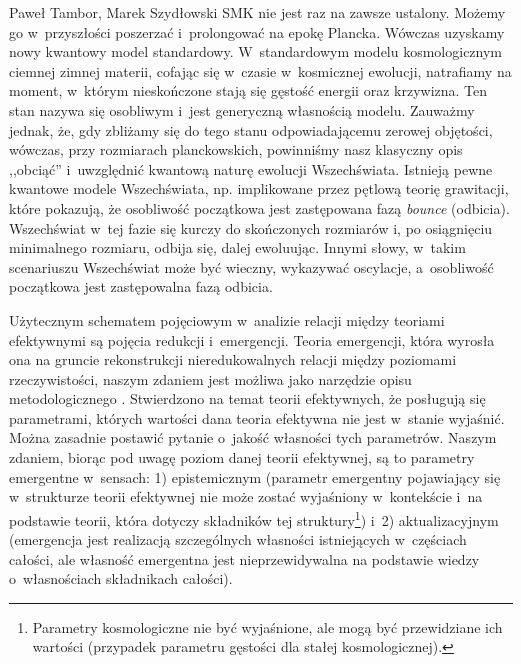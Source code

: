 \begin{artplenv2auth}{Paweł Tambor, Marek Szydłowski}
 SMK nie jest raz na zawsze ustalony. Możemy go w~przyszłości poszerzać i~prolongować na epokę Plancka. Wówczas uzyskamy nowy kwantowy model standardowy. W~standardowym modelu kosmologicznym ciemnej zimnej materii, cofając się w~czasie w~kosmicznej ewolucji, natrafiamy na moment, w~którym nieskończone stają się gęstość energii oraz krzywizna. Ten stan nazywa się osobliwym i~jest generyczną własnością modelu. Zauważmy jednak, że, gdy zbliżamy się do tego stanu odpowiadającemu zerowej objętości, wówczas, przy rozmiarach planckowskich, powinniśmy nasz klasyczny opis ,,obciąć'' i~uwzględnić kwantową naturę ewolucji Wszechświata. Istnieją pewne kwantowe modele Wszechświata, np. implikowane przez pętlową teorię grawitacji, które pokazują, że osobliwość początkowa jest zastępowana fazą \textit{bounce} (odbicia). Wszechświat w~tej fazie się kurczy do skończonych rozmiarów i, po osiągnięciu minimalnego rozmiaru, odbija się, dalej ewoluując. Innymi słowy, w~takim scenariuszu Wszechświat może być wieczny, wykazywać oscylacje, a~osobliwość początkowa jest zastępowalna fazą odbicia.

Użytecznym schematem pojęciowym w~analizie relacji między teoriami efektywnymi są pojęcia redukcji i~emergencji. Teoria emergencji, która wyrosła ona na gruncie rekonstrukcji nieredukowalnych relacji między poziomami rzeczywistości, naszym zdaniem jest możliwa jako narzędzie opisu metodologicznego
\parencite[][]{kim_making_1999}. %
 Stwierdzono na temat teorii efektywnych, że posługują się parametrami, których wartości dana teoria efektywna nie jest w~stanie wyjaśnić. Można zasadnie postawić pytanie o~jakość własności tych parametrów. Naszym zdaniem, biorąc pod uwagę poziom danej teorii efektywnej, są to parametry emergentne w~sensach: 1) epistemicznym (parametr emergentny pojawiający się w~strukturze teorii efektywnej nie może zostać wyjaśniony w~kontekście i~na podstawie teorii, która dotyczy składników tej struktury\footnote{Parametry kosmologiczne nie być wyjaśnione, ale mogą być przewidziane ich wartości (przypadek parametru gęstości dla stałej kosmologicznej).}) i~2) aktualizacyjnym (emergencja jest realizacją szczególnych własności istniejących w~częściach całości, ale własność emergentna jest nieprzewidywalna na podstawie wiedzy o~własnościach składnikach całości).


\end{artplenv2auth}
